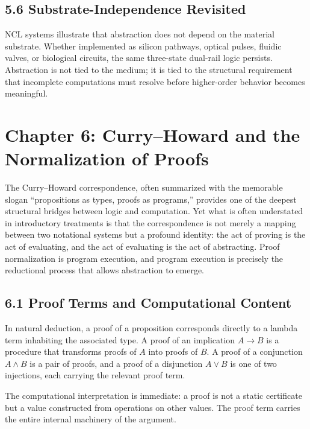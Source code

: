 \documentclass[11pt,letterpaper]{article}
\begin{document}
\subsection{5.6 Substrate-Independence Revisited}

NCL systems illustrate that abstraction does not depend on the material substrate. Whether implemented as silicon pathways, optical pulses, fluidic valves, or biological circuits, the same three-state dual-rail logic persists. Abstraction is not tied to the medium; it is tied to the structural requirement that incomplete computations must resolve before higher-order behavior becomes meaningful.

\newpage

\section{Chapter 6: Curry--Howard and the Normalization of Proofs}

The Curry--Howard correspondence, often summarized with the memorable slogan ``propositions as types, proofs as programs,'' provides one of the deepest structural bridges between logic and computation. Yet what is often understated in introductory treatments is that the correspondence is not merely a mapping between two notational systems but a profound identity: the act of proving is the act of evaluating, and the act of evaluating is the act of abstracting. Proof normalization is program execution, and program execution is precisely the reductional process that allows abstraction to emerge.

\subsection{6.1 Proof Terms and Computational Content}

In natural deduction, a proof of a proposition corresponds directly to a lambda term inhabiting the associated type. A proof of an implication \(A \to B\) is a procedure that transforms proofs of \(A\) into proofs of \(B\). A proof of a conjunction \(A \land B\) is a pair of proofs, and a proof of a disjunction \(A \lor B\) is one of two injections, each carrying the relevant proof term.

The computational interpretation is immediate: a proof is not a static certificate but a value constructed from operations on other values. The proof term carries the entire internal machinery of the argument.
\end{document}
